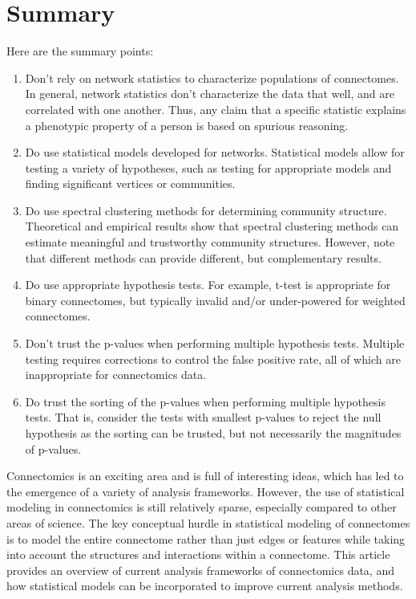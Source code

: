 \section{Summary}
Here are the summary points:
\begin{enumerate}
    \item Don't rely on network statistics to characterize populations of connectomes. In general, network statistics don't characterize the data that well, and are correlated with one another. Thus, any claim that a specific statistic explains a phenotypic property of a person is based on spurious reasoning.
    \item Do use statistical models developed for networks. Statistical models allow for testing a variety of hypotheses, such as testing for appropriate models and finding significant vertices or communities.
    \item Do use spectral clustering methods for determining community structure. Theoretical and empirical results show that spectral clustering methods can estimate meaningful and trustworthy community structures. However, note that different methods can provide different, but complementary results. 
    \item Do use appropriate hypothesis tests. For example, t-test is appropriate for binary connectomes, but typically invalid and/or under-powered for weighted connectomes.
    \item Don't trust the p-values when performing multiple hypothesis tests. Multiple testing requires corrections to control the false positive rate, all of which are inappropriate for connectomics data.
    \item Do trust the sorting of the p-values when performing multiple hypothesis tests. That is, consider the tests with smallest p-values to reject the null hypothesis as the sorting can be trusted, but not necessarily the magnitudes of p-values. 
\end{enumerate}

Connectomics is an exciting area and is full of interesting ideas, which has led to the emergence of a variety of analysis frameworks. However, the use of statistical modeling in connectomics is still relatively sparse, especially compared to other areas of science. The key conceptual hurdle in statistical modeling of connectomes is to model the entire connectome rather than just edges or features while taking into account the structures and interactions within a connectome. This article provides an overview of current analysis frameworks of connectomics data, and how statistical models can be incorporated to improve current analysis methods. %
